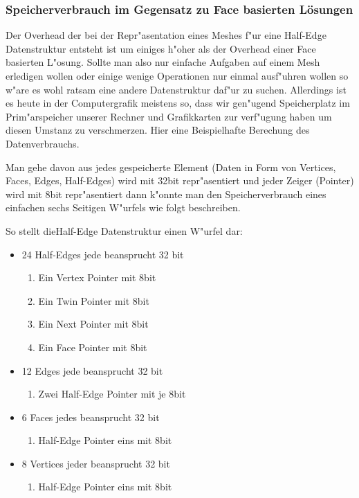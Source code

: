 \documentclass[pagesize, paper=a4, fontsize=12pt,titlepage=true, headings=small, headnosepline, abstractoff, liststotoc, nochapterprefix, plainheadsepline]{scrreprt}
\newcommand{\HES}{Half-Edge Datenstruktur }
\begin{document}
\subsubsection {Speicherverbrauch im Gegensatz zu Face basierten Lösungen}
			Der Overhead der bei der Repr"asentation eines Meshes f"ur eine \HES entsteht ist um einiges h"oher als der Overhead einer Face basierten L"osung. Sollte man also nur einfache Aufgaben auf einem Mesh erledigen wollen oder einige wenige Operationen nur einmal ausf"uhren wollen so w"are es wohl ratsam eine andere Datenstruktur daf"ur zu suchen. Allerdings ist es heute in der Computergrafik meistens so, dass wir gen"ugend Speicherplatz im Prim"arspeicher unserer Rechner und Grafikkarten zur verf"ugung haben um diesen Umstanz zu verschmerzen.
Hier eine Beispielhafte Berechung des Datenverbrauchs.

Man gehe davon aus jedes gespeicherte Element (Daten in Form von Vertices, Faces, Edges, Half-Edges) wird mit 32bit repr"asentiert und jeder Zeiger (Pointer) wird mit 8bit repr"asentiert dann k"onnte man den Speicherverbrauch eines einfachen sechs Seitigen W"urfels wie folgt beschreiben.

So stellt die\HES einen W"urfel dar:
\begin{itemize}
\item 24 Half-Edges jede beansprucht 32 bit
	\begin{enumerate}
    	\item Ein Vertex Pointer mit 8bit
    	\item Ein Twin Pointer mit 8bit
    	\item Ein Next Pointer mit 8bit
    	\item Ein Face Pointer mit 8bit
	\end{enumerate}
\item 12 Edges jede beansprucht 32 bit
	\begin{enumerate}
    	\item Zwei Half-Edge Pointer mit je 8bit
	\end{enumerate}
\item 6 Faces jedes beansprucht 32 bit
	\begin{enumerate}
    	\item Half-Edge Pointer eins mit 8bit
	\end{enumerate}
\item 8 Vertices jeder beansprucht 32 bit
	\begin{enumerate}
    	\item Half-Edge Pointer eins mit 8bit
	\end{enumerate}
\end{itemize}
\end{document}

